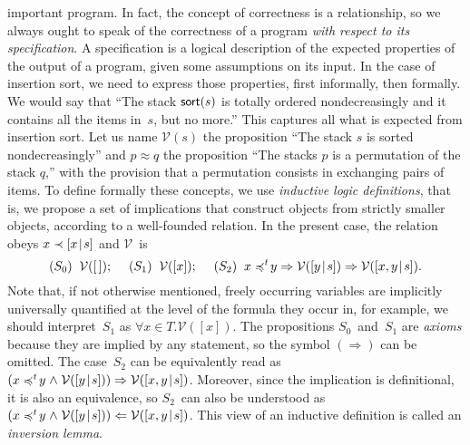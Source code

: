 important program. In fact, the concept of correctness is a
relationship, so we always ought to speak of the correctness of a
program \emph{with respect to its specification}. A specification is a
logical description of the expected properties of the output of a
program, given some assumptions on its input. In the case of insertion
sort, we need to express those properties, first informally, then
formally. We would say that ``The stack \(\textsf{sort}(s)\) is totally
ordered nondecreasingly and it contains all the items in~\(s\), but no
more.'' This captures all what is expected from insertion sort. Let us
name \(\mathcal{V}(s)\) the proposition ``The stack \(s\) is sorted
nondecreasingly'' and \({p \approx q}\) the proposition ``The stacks
\(p\) is a permutation of the stack \(q\),'' with the provision that a
permutation consists in exchanging pairs of items. To define formally
these concepts, we use \emph{inductive logic definitions}, that is, we
propose a set of implications that construct objects from strictly
smaller objects, according to a well\hyp{}founded relation. In the
present case, the relation obeys \(x \prec [{x}\!\mid\!{s}]\) and
\(\mathcal{V}\)~is
\[
(S_0) \;\; \mathcal{V}([\,]);\quad\;
(S_1) \;\; \mathcal{V}([x]);\quad\;
(S_2) \;\; x \mathrel{\preccurlyeq^t\!} y \Rightarrow \mathcal{V}([{y}\!\mid\!{s}])
     \Rightarrow \mathcal{V}([{x,y}\!\mid\!{s}]).
\]
Note that, if not otherwise mentioned, freely occurring variables are
implicitly universally quantified at the level of the formula they
occur in, for example, we should interpret~\(S_1\) as \(\forall x \in
T.\mathcal{V}([x])\). The propositions \(S_0\)~and~\(S_1\) are
\emph{axioms} because they are implied by any statement, so the symbol
\((\Rightarrow)\) can be omitted. The case~\(S_2\) can be equivalently
read as \((x \mathrel{\preccurlyeq^t\!} y \mathrel{\wedge} \mathcal{V}([{y}\!\mid\!{s}]))
\Rightarrow \mathcal{V}([{x,y}\!\mid\!{s}])\). Moreover, since the
implication is definitional, it is also an equivalence, so \(S_2\)~can
also be understood as \((x \mathrel{\preccurlyeq^t\!} y \mathrel{\wedge}
\mathcal{V}([{y}\!\mid\!{s}])) \Leftarrow
\mathcal{V}([{x,y}\!\mid\!{s}])\). This view of an inductive definition is
called an \emph{inversion lemma}.

